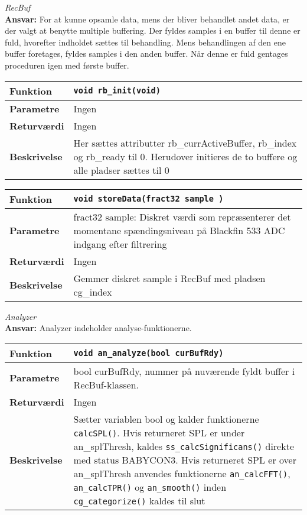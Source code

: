 \textit{RecBuf} \\
\textbf{Ansvar:} For at kunne opsamle data, mens der bliver behandlet andet data, er der valgt at benytte multiple buffering. Der fyldes samples i en buffer til denne er fuld, hvorefter indholdet sættes til behandling. Mens behandlingen af den ene buffer foretages, fyldes samples i den anden buffer. Når denne er fuld gentages proceduren igen med første buffer.

\begin{center}
    \begin{tabular}{ | l | p{} |}
    \hline
    \textbf{Funktion}	& \verb+void rb_init(void) +						\\ \hline
    \textbf{Parametre} 	& Ingen		\\ \hline
    \textbf{Returværdi}	& Ingen 								\\ \hline
    \textbf{Beskrivelse}& Her sættes attributter rb\_currActiveBuffer, rb\_index og rb\_ready til 0. Herudover initieres de to buffere og alle pladser sættes til 0 		\\ \hline
    \end{tabular}
\end{center} 

\begin{center}
    \begin{tabular}{ | l | p{} |}
    \hline
    \textbf{Funktion}	& \verb+void storeData(fract32 sample ) +						\\ \hline
    \textbf{Parametre} 	& fract32 sample: Diskret værdi som repræsenterer det momentane spændingsniveau på Blackfin 533 ADC indgang efter filtrering	\\ \hline
    \textbf{Returværdi}	& Ingen 								\\ \hline
    \textbf{Beskrivelse}& Gemmer diskret sample i RecBuf med pladsen cg\_index		\\ \hline
    \end{tabular}
\end{center} 



\textit{Analyzer} \\
\textbf{Ansvar:} Analyzer indeholder analyse-funktionerne.

\begin{center}
    \begin{tabular}{ | l | p{} |}
    \hline
    \textbf{Funktion}	& \verb+void an_analyze(bool curBufRdy) +			\\ \hline
    \textbf{Parametre} 	& bool curBufRdy, nummer på nuværende fyldt buffer i RecBuf-klassen.	\\ \hline
    \textbf{Returværdi}	& Ingen 													\\ \hline
    \textbf{Beskrivelse}& Sætter variablen bool og kalder funktionerne \verb+calcSPL()+. Hvis returneret SPL er under an\_splThresh, kaldes \verb+ss_calcSignificans()+ direkte med status BABYCON3. Hvis returneret SPL er over an\_splThresh anvendes funktionerne \verb+an_calcFFT()+, \verb+an_calcTPR()+ og \verb+an_smooth()+ inden \verb+cg_categorize()+ kaldes til slut	\\ \hline
    \end{tabular}
\end{center} 

